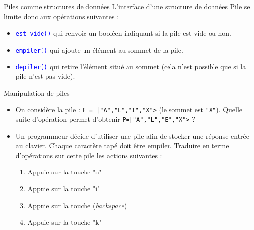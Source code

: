 \documentclass[10pt]{beamer}
\begin{document}
\begin{frame}{\Ctitle}{\stitle}
	\begin{alertblock}{Piles comme structures de données}
		L'interface d'une structure de données Pile se limite donc aux opérations suivantes :
		\begin{itemize}
			\item<2-> \textcolor{blue}{\tt est\_vide()} qui renvoie un booléen indiquant si la pile est vide ou non.
			\item<3-> \textcolor{blue}{\tt empiler()} qui ajoute un élément au sommet de la pile.
			\item<4-> \textcolor{blue}{\tt depiler()} qui retire l'élément situé au sommet (cela n'est possible que si la pile n'est pas vide).
		\end{itemize}
	\end{alertblock}
\end{frame}

\begin{frame}{\Ctitle}{\stitle}
	\begin{exampleblock}{Manipulation de piles}
		\begin{itemize}
			\item<2-> On considère la pile : {\tt P = |"A","L","I","X">} (le sommet est {\tt "X"}). Quelle suite d'opération permet d'obtenir {\tt P=|"A","L","E","X">} ?
			\item<3-> Un programmeur décide d'utiliser une pile afin de stocker une réponse entrée au clavier. Chaque caractère tapé doit être empiler. Traduire en terme d'opérations sur cette pile les actions suivantes :
				\begin{enumerate}
					\item<4-> Appuie sur la touche "o"
					\item<5-> Appuie sur la touche "i"
					\item<6-> Appuie sur la touche \framebox{$\longleftarrow$} (\textit{backspace})
					\item<7-> Appuie sur la touche "k"
				\end{enumerate}
		\end{itemize}
	\end{exampleblock}
\end{frame}
\end{document}
